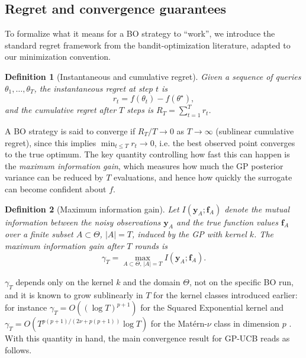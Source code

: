 \documentclass{article}
\newtheorem{defn}{Definition}
\begin{document}
	\subsection{Regret and convergence guarantees}
	
	To formalize what it means for a BO strategy to ``work'', we introduce the standard regret framework from the bandit-optimization literature, adapted to our minimization convention.
	
	\begin{defn}[Instantaneous and cumulative regret]
		Given a sequence of queries $\theta_1, \dots, \theta_T$, the \textit{instantaneous regret} at step $t$ is
		\begin{equation}
			r_t = f(\theta_t) - f(\theta^\star),
		\end{equation}
		and the \textit{cumulative regret} after $T$ steps is $R_T = \sum_{t=1}^T r_t$.
	\end{defn}
	
	A BO strategy is said to converge if $R_T / T \to 0$ as $T \to \infty$ (sublinear cumulative regret), since this implies $\min_{t \le T} r_t \to 0$, i.e. the best observed point converges to the true optimum. The key quantity controlling how fast this can happen is the \textit{maximum information gain}, which measures how much the GP posterior variance can be reduced by $T$ evaluations, and hence how quickly the surrogate can become confident about $f$.
	
	\begin{defn}[Maximum information gain]
		Let $I(\mathbf{y}_A; \mathbf{f}_A)$ denote the mutual information between the noisy observations $\mathbf{y}_A$ and the true function values $\mathbf{f}_A$ over a finite subset $A \subset \Theta$, $|A| = T$, induced by the GP with kernel $k$. The \textit{maximum information gain} after $T$ rounds is
		\begin{equation}
			\gamma_T = \max_{A \subset \Theta, \, |A| = T} I(\mathbf{y}_A; \mathbf{f}_A).
		\end{equation}
	\end{defn}
	
	$\gamma_T$ depends only on the kernel $k$ and the domain $\Theta$, not on the specific BO run, and it is known to grow sublinearly in $T$ for the kernel classes introduced earlier: for instance $\gamma_T = O((\log T)^{p+1})$ for the Squared Exponential kernel and $\gamma_T = O(T^{p(p+1)/(2\nu + p(p+1))} \log T)$ for the Matérn-$\nu$ class in dimension $p$ \cite{Srinivas2010}. With this quantity in hand, the main convergence result for GP-UCB reads as follows.
	
\end{document}
